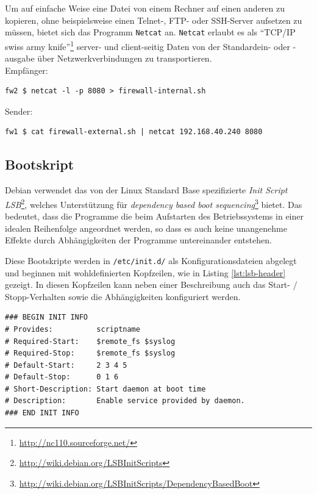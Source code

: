 Um auf einfache Weise eine Datei von einem Rechner auf einen anderen zu
kopieren, ohne beispielsweise einen Telnet-, FTP- oder SSH-Server aufsetzen zu
müssen, bietet sich das Programm {\tt Netcat} an.
{\tt Netcat} erlaubt es als "`TCP/IP swiss army knife"'\footnote{
\url{http://nc110.sourceforge.net/}
} server- und client-seitig Daten von der Standardein- oder -ausgabe über
Netzwerkverbindungen zu transportieren.\\

\noindent Empfänger:
\begin{verbatim}
fw2 $ netcat -l -p 8080 > firewall-internal.sh
\end{verbatim}

\noindent Sender:
\begin{verbatim}
fw1 $ cat firewall-external.sh | netcat 192.168.40.240 8080
\end{verbatim}


\subsection{Bootskript}

Debian verwendet das von der Linux Standard Base spezifizierte
\emph{Init Script LSB}\footnote{
\url{http://wiki.debian.org/LSBInitScripts}}, welches Unterstützung
für \emph{dependency based boot sequencing}\footnote{
\url{http://wiki.debian.org/LSBInitScripts/DependencyBasedBoot}
} bietet. Das bedeutet, dass
die Programme die beim Aufstarten des Betriebssystems in einer idealen
Reihenfolge angeordnet werden, so dass es auch keine unangenehme Effekte
durch Abhängigkeiten der Programme untereinander entstehen.

Diese Bootskripte werden in {\tt /etc/init.d/} als Konfigurationsdateien
abgelegt und beginnen mit wohldefinierten Kopfzeilen, wie in Listing
\ref{lst:lsb-header} gezeigt.
In diesen Kopfzeilen kann neben einer Beschreibung auch das
Start- / Stopp-Verhalten sowie die Abhängigkeiten konfiguriert werden.

\begin{lstlisting}[label=lst:lsb-header,caption={Init Script LSB: Kopfzeilen.}]
### BEGIN INIT INFO
# Provides:          scriptname
# Required-Start:    $remote_fs $syslog
# Required-Stop:     $remote_fs $syslog
# Default-Start:     2 3 4 5
# Default-Stop:      0 1 6
# Short-Description: Start daemon at boot time
# Description:       Enable service provided by daemon.
### END INIT INFO
\end{lstlisting}

